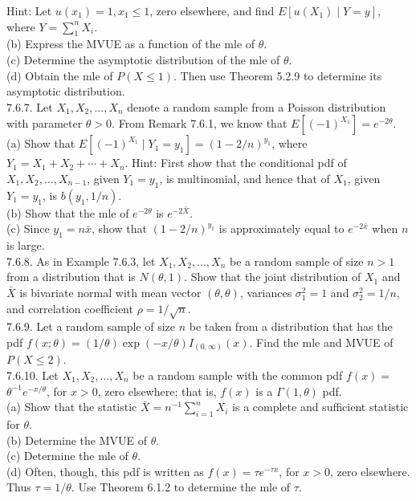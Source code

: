 Hint: Let $u\left(x_{1}\right)=1, x_{1} \leq 1$, zero elsewhere, and find $E\left[u\left(X_{1}\right) \mid Y=y\right]$, where $Y=\sum_{1}^{n} X_{i}$.\\
(b) Express the MVUE as a function of the mle of $\theta$.\\
(c) Determine the asymptotic distribution of the mle of $\theta$.\\
(d) Obtain the mle of $P(X \leq 1)$. Then use Theorem 5.2.9 to determine its asymptotic distribution.\\
7.6.7. Let $X_{1}, X_{2}, \ldots, X_{n}$ denote a random sample from a Poisson distribution with parameter $\theta>0$. From Remark 7.6.1, we know that $E\left[(-1)^{X_{1}}\right]=e^{-2 \theta}$.\\
(a) Show that $E\left[(-1)^{X_{1}} \mid Y_{1}=y_{1}\right]=(1-2 / n)^{y_{1}}$, where $Y_{1}=X_{1}+X_{2}+\cdots+X_{n}$. Hint: First show that the conditional pdf of $X_{1}, X_{2}, \ldots, X_{n-1}$, given $Y_{1}=y_{1}$, is multinomial, and hence that of $X_{1}$, given $Y_{1}=y_{1}$, is $b\left(y_{1}, 1 / n\right)$.\\
(b) Show that the mle of $e^{-2 \theta}$ is $e^{-2 \bar{X}}$.\\
(c) Since $y_{1}=n \bar{x}$, show that $(1-2 / n)^{y_{1}}$ is approximately equal to $e^{-2 \bar{x}}$ when $n$ is large.\\
7.6.8. As in Example 7.6.3, let $X_{1}, X_{2}, \ldots, X_{n}$ be a random sample of size $n>1$ from a distribution that is $N(\theta, 1)$. Show that the joint distribution of $X_{1}$ and $\bar{X}$ is bivariate normal with mean vector $(\theta, \theta)$, variances $\sigma_{1}^{2}=1$ and $\sigma_{2}^{2}=1 / n$, and correlation coefficient $\rho=1 / \sqrt{n}$.\\
7.6.9. Let a random sample of size $n$ be taken from a distribution that has the pdf $f(x ; \theta)=(1 / \theta) \exp (-x / \theta) I_{(0, \infty)}(x)$. Find the mle and MVUE of $P(X \leq 2)$.\\
7.6.10. Let $X_{1}, X_{2}, \ldots, X_{n}$ be a random sample with the common pdf $f(x)=$ $\theta^{-1} e^{-x / \theta}$, for $x>0$, zero elsewhere; that is, $f(x)$ is a $\Gamma(1, \theta)$ pdf.\\
(a) Show that the statistic $\bar{X}=n^{-1} \sum_{i=1}^{n} X_{i}$ is a complete and sufficient statistic for $\theta$.\\
(b) Determine the MVUE of $\theta$.\\
(c) Determine the mle of $\theta$.\\
(d) Often, though, this pdf is written as $f(x)=\tau e^{-\tau x}$, for $x>0$, zero elsewhere. Thus $\tau=1 / \theta$. Use Theorem 6.1.2 to determine the mle of $\tau$.\\
